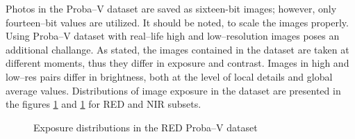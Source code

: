 Photos in the Proba--V dataset are saved as sixteen-bit images; however, only fourteen--bit values are utilized.
It should be noted, to scale the images properly.
Using Proba--V dataset with real--life high and low--resolution images poses an additional challange.
As stated, the images contained in the dataset are taken at different moments, thus they differ in exposure and contrast.
Images in high and low--res pairs differ in brightness, both at the level of local details and global average values.
Distributions of image exposure in the dataset are presented in the figures \ref{fig:exposure-dist-red} and \ref{fig:exposure-dist-red} for RED and NIR subsets.
\begin{figure}
        \centering
    \caption{Exposure distributions in the RED Proba--V dataset}
    \label{fig:exposure-dist-red}
\end{figure}
